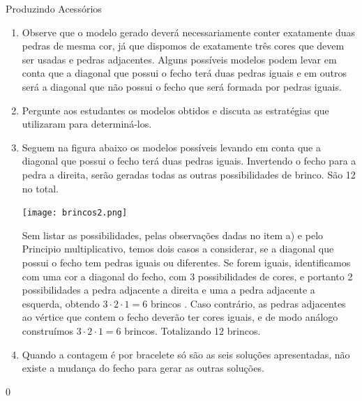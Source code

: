 \begin{answer}{Produzindo Acessórios}
{
\begin{enumerate}
\item Observe que o modelo gerado deverá necessariamente conter exatamente duas pedras de mesma cor, já que dispomos de exatamente três cores que devem ser usadas e pedras adjacentes. Alguns possíveis modelos podem levar em conta que a diagonal que possui o fecho terá duas pedras iguais e em outros será a diagonal que não possui o fecho que será formada por pedras iguais.
\item Pergunte aos estudantes os modelos obtidos e discuta as estratégias que utilizaram para determiná-los.
\item Seguem na figura abaixo os modelos possíveis levando em conta que a diagonal que possui o fecho terá duas pedras iguais. Invertendo o fecho para a pedra a direita, serão geradas todas as outras possibilidades de brinco. São 12 no total.
\begin{center}
\texttt{[image: brincos2.png]}
\end{center}

Sem listar as possibilidades, pelas observações dadas no item a) e pelo Principio multiplicativo, temos dois casos a considerar, se a diagonal que possui o fecho tem pedras iguais ou diferentes. Se forem iguais, identificamos com uma cor a diagonal do fecho, com 3 possibilidades de cores, e portanto 2 possibilidades a pedra adjacente a direita e uma a pedra adjacente a esquerda, obtendo $3 \cdot 2 \cdot 1=6$ brincos . Caso contrário, as pedras adjacentes ao vértice que contem o fecho deverão ter cores iguais, e de modo análogo construímos $3 \cdot 2 \cdot 1=6$  brincos. Totalizando 12 brincos.
\item Quando a contagem é por bracelete só são as seis soluções apresentadas, não existe a mudança do fecho para gerar as outras soluções. 

\end{enumerate}
}{0}
\end{answer}
\clearmargin
